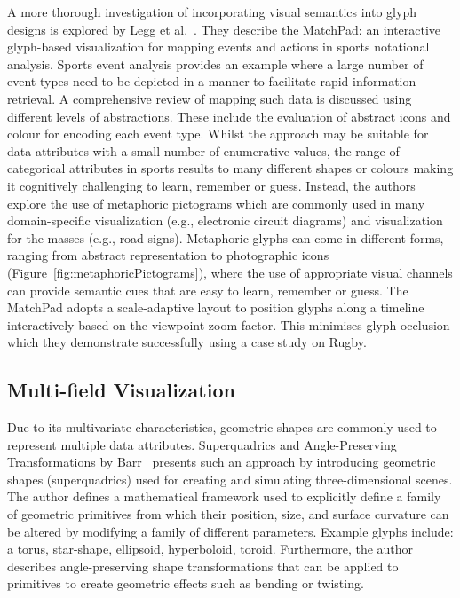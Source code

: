 A more thorough investigation of incorporating visual semantics into glyph designs is explored by Legg et al.~\cite{legg12matchPad}. 
They describe the MatchPad: an interactive glyph-based visualization for mapping events and actions in sports notational analysis. 
Sports event analysis provides an example where a large number of event types need to be depicted in a manner to facilitate rapid information retrieval. 
A comprehensive review of mapping such data is discussed using different levels of abstractions. 
These include the evaluation of abstract icons and colour for encoding each event type.
Whilst the approach may be suitable for data attributes with a small number of enumerative values, the range of categorical attributes in sports results to many different shapes or colours making it cognitively challenging to learn, remember or guess.  
Instead, the authors explore the use of metaphoric pictograms which are commonly used in many domain-specific visualization (e.g., electronic circuit diagrams) and visualization for the masses (e.g., road signs).
Metaphoric glyphs can come in different forms, ranging from abstract representation to photographic icons (Figure~\ref{fig:metaphoricPictograms}), where the use of appropriate visual channels can provide semantic cues that are easy to learn, remember or guess.
The MatchPad adopts a scale-adaptive layout to position glyphs along a timeline interactively based on the viewpoint zoom factor. 
This minimises glyph occlusion which they demonstrate successfully using a case study on Rugby.

\subsection{Multi-field Visualization}

Due to its multivariate characteristics, geometric shapes are commonly used to represent multiple data attributes. Superquadrics and Angle-Preserving Transformations by Barr~\cite{barr81} presents such an approach by introducing geometric shapes (superquadrics) used for creating and simulating three-dimensional scenes. The author defines a mathematical framework used to explicitly define a family of geometric primitives from which their position, size, and surface curvature can be altered by modifying a family of different parameters. Example glyphs include: a torus, star-shape, ellipsoid, hyperboloid, toroid. Furthermore, the author describes angle-preserving shape transformations that can be applied to primitives to create geometric effects such as bending or twisting.

